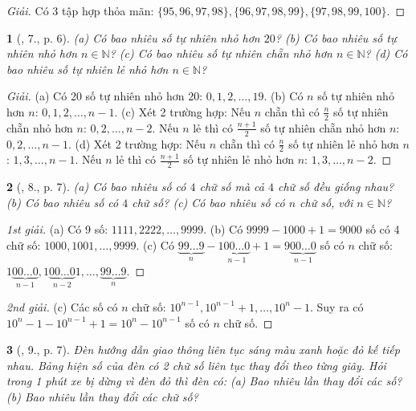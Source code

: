 \documentclass{article}
\newtheorem{baitoan}{}
\begin{document}
\begin{proof}[Giải]
	Có 3 tập hợp thỏa mãn: $\{95,96,97,98\},\{96,97,98,99\},\{97,98,99,100\}$.
\end{proof}

\begin{baitoan}[\cite{Tuyen_Toan_6}, 7., p. 6]
	(a) Có bao nhiêu số tự nhiên nhỏ hơn $20$? (b) Có bao nhiêu số tự nhiên nhỏ hơn $n\in\mathbb{N}$? (c) Có bao nhiêu số tự nhiên chẵn nhỏ hơn $n\in\mathbb{N}$? (d) Có bao nhiêu số tự nhiên lẻ nhỏ hơn $n\in\mathbb{N}$?
\end{baitoan}

\begin{proof}[Giải]
	(a) Có 20 số tự nhiên nhỏ hơn 20: $0,1,2,\ldots,19$. (b) Có $n$ số tự nhiên nhỏ hơn $n$: $0,1,2,\ldots,n - 1$. (c) Xét 2 trường hợp: Nếu $n$ chẵn thì có $\frac{n}{2}$ số tự nhiên chẵn nhỏ hơn $n$: $0,2,\ldots,n - 2$. Nếu $n$ lẻ thì có $\frac{n + 1}{2}$ số tự nhiên chẵn nhỏ hơn $n$: $0,2,\ldots,n - 1$. (d) Xét 2 trường hợp: Nếu $n$ chẵn thì có $\frac{n}{2}$ số tự nhiên lẻ nhỏ hơn $n$: $1,3,\ldots,n - 1$. Nếu $n$ lẻ thì có $\frac{n + 1}{2}$ số tự nhiên lẻ nhỏ hơn $n$: $1,3,\ldots,n - 2$.
\end{proof}

\begin{baitoan}[\cite{Tuyen_Toan_6}, 8., p. 7]
	(a) Có bao nhiêu số có $4$ chữ số mà cả $4$ chữ số đều giống nhau? (b) Có bao nhiêu số có $4$ chữ số? (c) Có bao nhiêu số có $n$ chữ số, với $n\in\mathbb{N}$?
\end{baitoan}

\begin{proof}[1st giải]
	(a) Có 9 số: $1111,2222,\ldots,9999$. (b) Có $9999 - 1000 + 1 = 9000$ số có 4 chữ số: $1000,1001,\ldots,9999$. (c) Có $\underbrace{99\ldots9}_n - 1\underbrace{00\ldots0}_{n-1} + 1 = 9\underbrace{00\ldots0}_{n-1}$ số có $n$ chữ số: $1\underbrace{00\ldots0}_{n-1},1\underbrace{00\ldots0}_{n-2}1,\ldots,\underbrace{99\ldots9}_n$.
\end{proof}

\begin{proof}[2nd giải]
	(c) Các số có $n$ chữ số: $10^{n-1},10^{n-1} + 1,\ldots,10^n - 1$. Suy ra có $10^n - 1 - 10^{n-1} + 1 = 10^n - 10^{n-1}$ số có $n$ chữ số.
\end{proof}

\begin{baitoan}[\cite{Tuyen_Toan_6}, 9., p. 7]
	Đèn hướng dẫn giao thông liên tục sáng màu xanh hoặc đỏ kế tiếp nhau. Bảng hiện số của đèn có 2 chữ số liên tục thay đổi theo từng giây. Hỏi trong 1 phút xe bị dừng vì đèn đỏ thì đèn có: (a) Bao nhiêu lần thay đổi các số? (b) Bao nhiêu lần thay đổi các chữ số?
\end{baitoan}
\end{document}
